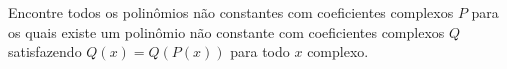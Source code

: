 Encontre todos os polinômios não constantes com coeficientes complexos $P$ para os quais existe um polinômio não constante com coeficientes complexos $Q$ satisfazendo $Q(x) = Q(P(x))$ para todo $x$ complexo.
